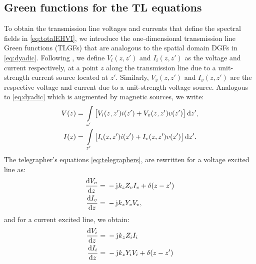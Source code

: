 \documentclass[12pt]{article}
\begin{document}
\subsection{Green functions for the TL equations}
%
To obtain the transmission line voltages and currents that define the spectral fields in \eqref{eq:totalEHVI}, we introduce the one-dimensional transmission line Green functions (TLGFs) that are analogous to the spatial domain DGFs in \eqref{eq:dyadic}. Following \cite{Felsen1994,Michalski2005}, we define $V_i(z,z')$ and $I_i(z,z')$ as the voltage and current respectively, at a point $z$ along the transmission line due to a unit-strength current source located at $z'$. Similarly, $V_v(z,z')$ and $I_v(z,z')$ are the respective voltage and current due to a unit-strength voltage source. Analogous to \eqref{eq:dyadic} which is augmented by magnetic sources, we write:
%
\begin{subequations}
  \begin{align}
    V(z) ={}& \int\limits_{z'} \left[ V_i(z,z') i(z') + V_v(z,z') v(z') \right] \mathop{}\!\mathrm{d}{z'},
    \label{eq:TLGF_V}\\
    I(z) ={}& \int\limits_{z'} \left[ I_i(z,z') i(z') + I_v(z,z') v(z') \right] \mathop{}\!\mathrm{d}{z'}.
    \label{eq:TLGF_I}
  \end{align}
  \label{eq:TLGF_analogy}%
\end{subequations}
%
The telegrapher's equations \eqref{eq:telegraphers}, are rewritten for a voltage excited line as:
%
\begin{subequations}
  \begin{align}
    \dv{V_v}{z} ={}& -\mathrm{j}\mkern1mu k_z Z_v I_v + \delta(z - z')
    \label{eq:TLGF_V_v}\\
    \dv{I_v}{z} ={}& -\mathrm{j}\mkern1mu k_z Y_v V_v,
    \label{eq:TLGF_I_v}
  \end{align}
  \label{eq:TLGF_v_telelgraphers}%
\end{subequations}
%
and for a current excited line, we obtain:
%
\begin{subequations}
  \begin{align}
    \dv{V_i}{z} ={}& -\mathrm{j}\mkern1mu k_z Z_i I_i
    \label{eq:TLGF_V_i}\\
    \dv{I_i}{z} ={}& -\mathrm{j}\mkern1mu k_z Y_i V_i + \delta(z - z')
    \label{eq:TLGF_I_i}
  \end{align}
  \label{eq:TLGF_i_telelgraphers}%
\end{subequations}
%
\end{document}
